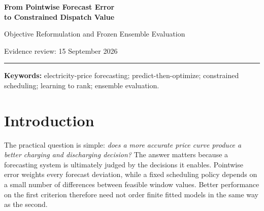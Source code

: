 \documentclass[11pt,a4paper]{article}
\begin{document}
\begin{center}
{\LARGE\bfseries\color{ink} From Pointwise Forecast Error\\[3pt] to Constrained Dispatch Value}\par\vspace{7pt}
{\large Objective Reformulation and Frozen Ensemble Evaluation}\par\vspace{10pt}
\par
{\small Evidence review: 15 September 2026}
\end{center}
\vspace{3pt}\noindent\textcolor{accent}{\rule{\linewidth}{0.8pt}}
\begin{abstract}
Electricity-price forecasts in this project serve a constrained daily scheduling decision: choose one eight-slot charging block followed by one eight-slot discharging block, or remain idle. We begin with a failure of the original evaluation logic: lower pointwise RMSE does not reliably identify higher realized dispatch value among the saved candidates. We explain this through the geometry of the feasible actions and reformulate learning as maximizing the realized value of the action induced by a forecast. The implementation combines centered block-sum regression, a listwise window loss, and a frozen five-seed price-curve average. On the specified 59-day evaluation period, this protocol realizes a mean score of \textbf{6693.88}, compared with \textbf{6214.36} for the historical MSE-trained Transformer reference: an observed gain of \textbf{479.51 (7.72\%)}. Window-ranking consistency has a stronger descriptive association with value than point error, whereas the training surrogate itself does not show a stable association. The gain is concentrated: 86.0\% of its net total arises on one day, the paired seven-day block interval is $[-227.87,1626.28]$, and the headline records a deeper single-day loss than the reference in the same window. The contribution is a traceable failure-driven formulation and implementation with a positive period-specific outcome; transferable improvement and loss-specific causality remain open.
\end{abstract}
\noindent\textbf{Keywords:} electricity-price forecasting; predict-then-optimize; constrained scheduling; learning to rank; ensemble evaluation.

\section{Introduction}
The practical question is simple: \emph{does a more accurate price curve produce a better charging and discharging decision?} The answer matters because a forecasting system is ultimately judged by the decisions it enables. Pointwise error weights every forecast deviation, while a fixed scheduling policy depends on a small number of differences between feasible window values. Better performance on the first criterion therefore need not order finite fitted models in the same way as the second.
\end{document}
